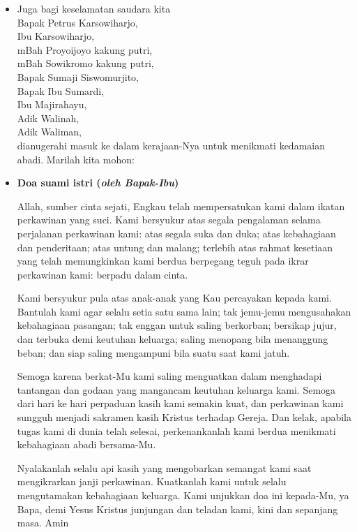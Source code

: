 \documentclass[a5paper,12pt,openany]{scrbook}
\newcommand{\BP}[1]{\begin{itemize} \item[P:] #1 \end{itemize}}
\begin{document}
\BP{Juga bagi keselamatan saudara kita\\ 
Bapak Petrus Karsowiharjo, \\
Ibu Karsowiharjo, \\
mBah Proyoijoyo kakung putri,\\
mBah Sowikromo kakung putri,\\
Bapak Sumaji Siswomurjito,\\
Bapak Ibu Sumardi,\\
Ibu Majirahayu,\\
Adik Walinah, \\
Adik Waliman,\\
dianugerahi masuk ke dalam kerajaan-Nya untuk 
menikmati kedamaian abadi. 
Marilah kita mohon:}


\BP{\textbf{Doa suami istri (\textit{oleh Bapak-Ibu})}

Allah, sumber cinta sejati, Engkau telah mempersatukan kami dalam ikatan perkawinan yang suci. Kami bersyukur atas segala pengalaman selama perjalanan perkawinan kami: atas segala suka dan duka; atas kebahagiaan dan penderitaan; atas untung dan malang; terlebih atas rahmat kesetiaan yang telah memungkinkan kami berdua berpegang teguh pada ikrar perkawinan kami: berpadu dalam cinta.

Kami bersyukur pula atas anak-anak yang Kau percayakan kepada kami. Bantulah kami agar selalu setia satu sama lain; tak jemu-jemu mengusahakan kebahagiaan pasangan; tak enggan untuk saling berkorban; bersikap jujur, dan terbuka demi keutuhan keluarga; saling menopang bila menanggung beban; dan siap saling mengampuni bila suatu saat kami jatuh.

Semoga karena berkat-Mu kami saling menguatkan dalam menghadapi tantangan dan godaan yang mangancam keutuhan keluarga kami. Semoga dari hari ke hari perpaduan kasih kami semakin kuat, dan perkawinan kami sungguh menjadi sakramen kasih Kristus terhadap Gereja. Dan kelak, apabila tugas kami di dunia telah selesai, perkenankanlah kami berdua menikmati kebahagiaan abadi bersama-Mu.

Nyalakanlah selalu api kasih yang mengobarkan semangat kami saat mengikrarkan janji perkawinan. Kuatkanlah kami untuk selalu mengutamakan kebahagiaan keluarga.
Kami unjukkan doa ini kepada-Mu, ya Bapa, demi Yesus Kristus junjungan dan teladan kami, kini dan sepanjang masa. Amin}
\end{document}
